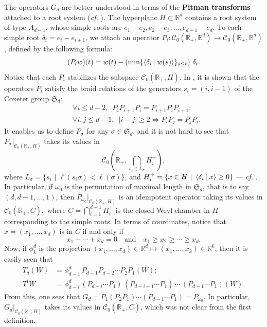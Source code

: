 \documentclass[smallextended,nospthms]{svjour3}
\theoremstyle{remark}
\newcommand{\R}{\mathbb{R}}
\newcommand{\sym}{\mathfrak{S}}
\newcommand{\scal}[2]{\left\langle #1\vphantom{#2}\,\right |\left.#2 \vphantom{#1}\right\rangle}
\begin{document}
The operators $G_{d}$ are better understood in terms of the \textbf{Pitman transforms} attached to a root system (\emph{cf.} \cite{BBO05}). The hyperplane $H\subset \R^{d}$ contains a root system of type $A_{d-1}$, whose simple roots are $e_{1}-e_{2},e_{2}-e_{3},\ldots,e_{d-1}-e_{d}$. To each simple root $\delta_{i}=e_{i}-e_{i+1}$, we attach an operator $P_{i} : \mathscr{C}_{0}(\R_{+},\R^{d}) \to \mathscr{C}_{0}(\R_{+},\R^{d})$, defined by the following formula:\label{pitmanoperator}
$$(P_{i}w)(t)=w(t)-\left(\min\{ \scal{\delta_{i}}{w(s)}\}_{s \leq t}\right)\,\delta_{i}.$$
Notice that each $P_{i}$ stabilizes the subspace $\mathscr{C}_{0}(\R_{+},H)$. In \cite{BBO05}, it is shown that the operators $P_{i}$ satisfy the braid relations of the generators $s_{i}=(i,i-1)$ of the Coxeter group $\sym_{d}$:
\begin{align*}
&\forall i \leq d-2,\,\,\,P_{i}P_{i+1}P_{i}=P_{i+1}P_{i}P_{i+1};\\
&\forall i,j \leq d-1,\,\,\,|i-j|\geq 2 \Rightarrow P_{i}P_{j}=P_{j}P_{i}.
\end{align*}
It enables us to define $P_{\sigma}$ for any $\sigma \in \sym_{d}$, and it is not hard to see that $P_{\sigma}|_{\mathscr{C}_{0}(\R_{+},H)}$ takes its values in
$$\mathscr{C}_{0}\left(\R_{+},\bigcap_{s_{i} \in L_{\sigma}} H_{i}^{+}\right),$$
where $L_{\sigma}= \{s_{i} \,\,|\,\, \ell(s_{i}\sigma)<\ell(\sigma)\}$, and $H_{i}^{+} =\{x \in H\,\,|\,\,\scal{\delta_{i}}{x}\geq 0\}$ --- \emph{cf.} \cite[Proposition 2.8]{BBO05}. In particular, if $\omega_{0}$ is the permutation of maximal length in $\sym_{d}$, that is to say $(d,d-1,\ldots,1)$, then $P_{\omega_{0}}|_{\mathscr{C}_{0}(\R_{+},H)}$ is an idempotent operator taking its values in $\mathscr{C}_{0}(\R_{+},C),$ where $C=\bigcap_{i=1}^{d-1} H_{i}^{+}$ is the closed Weyl chamber in $H$ corresponding to the simple roots. In terms of coordinates, notice that $x =(x_{1},\ldots,x_{d})$ is in $C$ if and only if
$$x_{1}+\cdots+x_{d}=0 \quad\text{and}\quad x_{1}\geq x_{2}\geq \cdots \geq x_{d}.$$
Now, if $\phi_{k}^{d}$ is the projection $(x_{1},\ldots,x_{d}) \in \R^{d}\mapsto (x_{1},\ldots,x_{k}) \in \R^{k}$, then it is easily seen that
\begin{align*}
T_{d}(W)&=\phi_{d-1}^{d}\,P_{d-1}P_{d-2}\cdots P_{2}P_{1}(W);\\
T^{i}W&=\phi_{d-i}^{d}\,(P_{d-i}\cdots P_{1})\,(P_{d-i+1}\cdots P_{1})\,\cdots\, (P_{d-1}\cdots P_{1})(W).
\end{align*}
From this, one sees that $G_{d}=P_{1}(P_{2}P_{1})\cdots(P_{d-1}\cdots P_{1})= P_{\omega_{0}}$. In particular, $G_{d}|_{\mathscr{C}_{0}(\R_{+},H)}$ takes its values in $\mathscr{C}_{0}(\R_{+},C)$, which was not clear from the first definition. \bigskip
\bigskip
\end{document}
